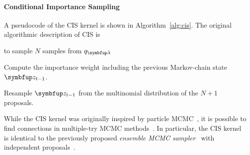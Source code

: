 \paragraph{Conditional Importance Sampling}
A pseudocode of the CIS kernel is shown in Algorithm~\ref{alg:cis}.
The original algorithmic description of CIS is
\begin{enumerate*}[label=(\arabic*)]
  \item to sample \(N\) samples from \(q_{\vlambda}\)
  \item Compute the importance weight including the previous Markov-chain state \(\vz_{t-1}\).
  \item Resample \(\vz_{t-1}\) from the multinomial distribution of the \(N+1\) proposals.
\end{enumerate*}
%
While the CIS kernel was originally inspired by particle MCMC~\citep{andrieu_particle_2010}, it is possible to find connections in multiple-try MCMC methods~\citep{martino_review_2018}.
In particular, the CIS kernel is identical to the previously proposed \textit{ensemble MCMC sampler}~\citep{neal_mcmc_2011a, austad_parallel_2007} with independent proposals~\citep[Table 12]{martino_review_2018}.

